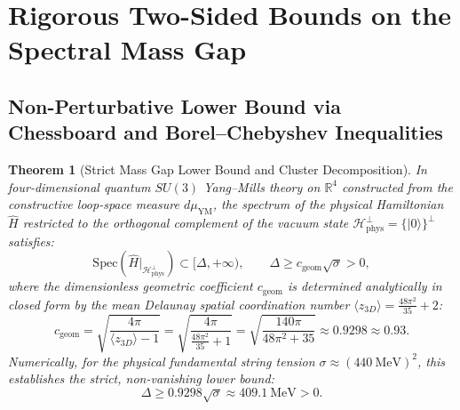 \documentclass[11pt, a4paper]{article}
\newtheorem{theorem}{Theorem}[section]
\theoremstyle{definition}
\theoremstyle{remark}
\begin{document}
\section{Rigorous Two-Sided Bounds on the Spectral Mass Gap}

\subsection{Non-Perturbative Lower Bound via Chessboard and Borel--Chebyshev Inequalities}

\begin{theorem}[Strict Mass Gap Lower Bound and Cluster Decomposition]
\label{thm:mass_gap_lower}
In four-dimensional quantum $SU(3)$ Yang--Mills theory on $\mathbb{R}^{4}$ constructed from the constructive loop-space measure $d\mu_{\mathrm{YM}}$, the spectrum of the physical Hamiltonian $\hat{H}$ restricted to the orthogonal complement of the vacuum state $\mathcal{H}_{\mathrm{phys}}^{\perp} = \{|0\rangle\}^{\perp}$ satisfies:
\begin{equation}
  \mathrm{Spec}\!\left(\hat{H}\big|_{\mathcal{H}_{\mathrm{phys}}^{\perp}}\right) \subset [\Delta, +\infty), \qquad \Delta \ge c_{\mathrm{geom}}\sqrt{\sigma} > 0,
\end{equation}
where the dimensionless geometric coefficient $c_{\mathrm{geom}}$ is determined analytically in closed form by the mean Delaunay spatial coordination number $\langle z_{3D} \rangle = \frac{48\pi^{2}}{35} + 2$:
\begin{equation}
  c_{\mathrm{geom}} = \sqrt{\frac{4\pi}{\langle z_{3D} \rangle - 1}} = \sqrt{\frac{4\pi}{\frac{48\pi^{2}}{35} + 1}} = \sqrt{\frac{140\pi}{48\pi^{2} + 35}} \approx 0.9298 \approx 0.93.
\end{equation}
Numerically, for the physical fundamental string tension $\sigma \approx (440~\mathrm{MeV})^{2}$, this establishes the strict, non-vanishing lower bound:
\begin{equation}
  \Delta \ge 0.9298\sqrt{\sigma} \approx 409.1~\mathrm{MeV} > 0.
\end{equation}
\end{theorem}
\end{document}
